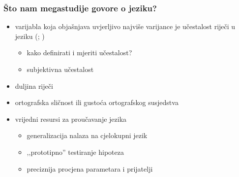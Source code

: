 \documentclass[aspectratio=169]{beamer}
\newcommand{\tinycitep}[1]{%
    \bgroup
    \scriptsize
    \citep{#1}
    \egroup}
\begin{document}
\begin{frame}
    \frametitle{Što nam megastudije govore o jeziku?}

    \begin{itemize}
        \item varijabla koja objašnjava uvjerljivo najviše varijance je
            učestalost riječi u jeziku
            \bgroup
            \scriptsize
            (\citealp*{balotaVisualWordRecognition2006};
            \citealp[ch. 6]{harleyPsychologyLanguageData2014})
            \egroup
        \begin{itemize}
            \pause

            \item kako definirati i mjeriti učestalost?

            \pause

            \item subjektivna učestalost
        \end{itemize}

        \pause

        \item duljina riječi \tinycitep{ferrandMEGALEXMegastudyVisual2018,
            brysbaertImpactWordPrevalence2016}

        \pause

        \item ortografska sličnost ili gustoća ortografskog susjedstva
            \tinycitep{coltheartAccessInternalLexicon1977,
            yarkoniMovingColtheartNew2008}
    \end{itemize}
\end{frame}

\begin{frame}
    \begin{itemize}
        \item vrijedni resursi za proučavanje jezika

        \begin{itemize}
            \item generalizacija nalaza na cjelokupni jezik
                \tinycitep{yarkoniGeneralizabilityCrisis2019}

            \pause

            \item ,,prototipno'' testiranje hipoteza

            \pause

            \item preciznija procjena parametara i prijatelji
                \tinycitep{yarkoniChoosingPredictionExplanation2017}
        \end{itemize}

    \end{itemize}
\end{frame}
\end{document}
